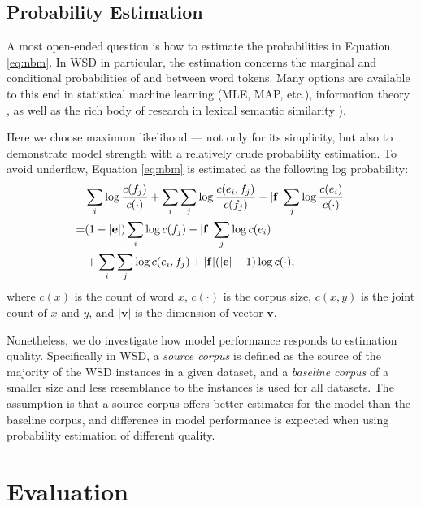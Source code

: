 \documentclass[11pt]{article}
\begin{document}
\subsection{Probability Estimation}
\label{sec:prob-estim}
A most open-ended question is how to estimate the probabilities in
Equation \eqref{eq:nbm}. In WSD in particular, the estimation concerns
the marginal and conditional probabilities of and between word
tokens. Many options are available to this end in statistical machine
learning (MLE, MAP, etc.), information theory
\citep{church1990word,turney_miningweb_2001}, as well as the rich body
of research in lexical semantic similarity
\citealp{resnik1995using,jiang1997semantic,budanitsky2006evaluating}).

Here we choose maximum likelihood --- not only for its simplicity, but
also to demonstrate model strength with a relatively crude probability
estimation. To avoid underflow, Equation \eqref{eq:nbm} is estimated as the following log probability:
\begin{equation*} 
\hspace{-1.5mm} \begin{aligned}
    &\sum_i\log \frac{c(f_j)}{c(\cdot)}+\sum_i\sum_j\log
    \frac{c(e_i,f_j)}{c(f_j)}-|\mathbf{f}|\sum_j\log \frac{c(e_i)}{c(\cdot)}\\
    =&(1-|\mathbf{e}|)\sum_i\log c(f_j)-|\mathbf{f}|\sum_j\log c(e_i)\\
    &+\sum_i\sum_j\log c(e_i,f_j)+|\mathbf{f}|(|\mathbf{e}|-1)\log
    c(\cdot),
\end{aligned}%
\end{equation*}
where $c(x)$ is the count of word $x$, $c(\cdot)$ is the corpus size,
$c(x,y)$ is the joint count of $x$ and $y$, and $|\mathbf{v}|$ is the
dimension of vector $\mathbf{v}$.

Nonetheless, we do investigate how model performance responds to
estimation quality. Specifically in WSD, a \textit{source corpus} is
defined as the source of the majority of the WSD instances in a given
dataset, and a \textit{baseline corpus} of a smaller size and less
resemblance to the instances is used for all datasets. The assumption
is that a source corpus offers better estimates for the model than the
baseline corpus, and difference in model performance is expected when
using probability estimation of different quality.

\section{Evaluation}
\label{sec:evaluation}
\end{document}
